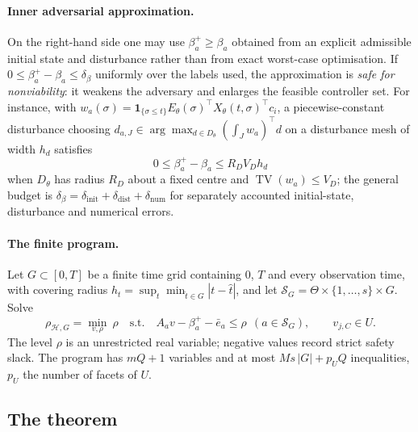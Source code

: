 \documentclass[11pt,a4paper]{article}
\theoremstyle{plain}
\theoremstyle{definition}
\theoremstyle{remark}
\newcommand{\calH}{\mathcal{H}}
\newcommand{\calS}{\mathscr{S}}
\newcommand{\rhoHG}{\rho_{\calH,G}}
\newcommand{\ebar}{\bar{e}}
\DeclareMathOperator{\TV}{TV}
\begin{document}
\paragraph{Inner adversarial approximation.}
On the right-hand side one may use $\beta^+_a\ge\beta_a$ obtained from an explicit admissible initial state and disturbance rather than from exact worst-case optimisation. If $0\le\beta^+_a-\beta_a\le\delta_\beta$ uniformly over the labels used, the approximation is \emph{safe for nonviability}: it weakens the adversary and enlarges the feasible controller set. For instance, with $w_a(\sigma)=\mathbf 1_{\{\sigma\le t\}}E_\theta(\sigma)^\top X_\theta(t,\sigma)^\top c_i$, a piecewise-constant disturbance choosing $d_{a,J}\in\arg\max_{d\in D_\theta}(\int_Jw_a)^\top d$ on a disturbance mesh of width $h_d$ satisfies
\begin{equation}\label{eq:distbound}
0\le\beta^+_a-\beta_a\le R_DV_Dh_d
\end{equation}
when $D_\theta$ has radius $R_D$ about a fixed centre and $\TV(w_a)\le V_D$; the general budget is $\delta_\beta=\delta_{\mathrm{init}}+\delta_{\mathrm{dist}}+\delta_{\mathrm{num}}$ for separately accounted initial-state, disturbance and numerical errors.

\paragraph{The finite program.}
Let $G\subset[0,T]$ be a finite time grid containing $0$, $T$ and every observation time, with covering radius $h_t=\sup_{t}\min_{\hat t\in G}|t-\hat t|$, and let $\calS_G=\Theta\times\{1,\dots,s\}\times G$. Solve
\begin{equation}\label{eq:lp}
\rhoHG=\min_{v,\rho}\ \rho\quad\text{s.t.}\quad A_av-\beta^+_a-\ebar_a\le\rho\ \ (a\in\calS_G),\qquad v_{j,C}\in U .
\end{equation}
The level $\rho$ is an unrestricted real variable; negative values record strict safety slack. The program has $mQ+1$ variables and at most $Ms\,|G|+p_UQ$ inequalities, $p_U$ the number of facets of $U$.

\subsection{The theorem}
\end{document}
